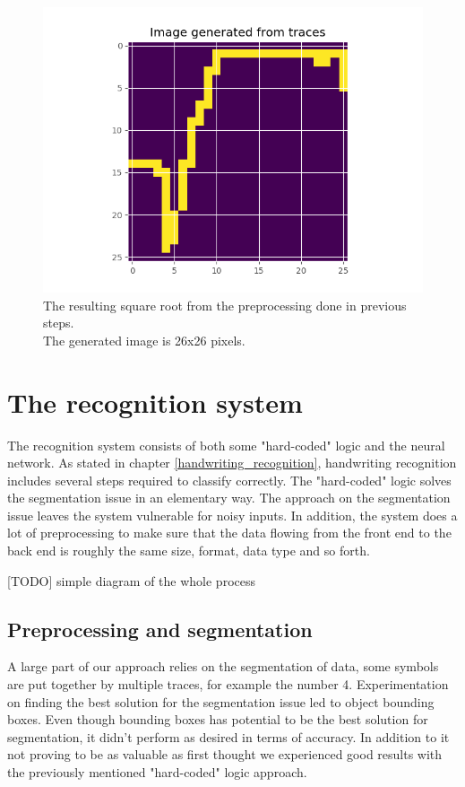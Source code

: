 \begin{figure}[H]
    \centering
    \includegraphics[width=\linewidth,keepaspectratio]{Assets/Chapter3_Method/sqrt_image.png}
    \caption{The resulting square root from the preprocessing done in previous steps.\\The generated image is 26x26 pixels.}
    \label{fig:sqrt_img}
\end{figure}

\section{The recognition system}
\label{the_recognintion_system}
The recognition system consists of both some "hard-coded" logic and the neural network. As stated in chapter \ref{handwriting_recognition}, handwriting recognition includes several steps required to classify correctly. The "hard-coded" logic solves the segmentation issue in an elementary way. The approach on the segmentation issue leaves the system vulnerable for noisy inputs. In addition, the system does a lot of preprocessing to make sure that the data flowing from the front end to the back end is roughly the same size, format, data type and so forth. 

[TODO] simple diagram of the whole process %

\subsection{Preprocessing and segmentation}
A large part of our approach relies on the segmentation of data, some symbols are put together by multiple traces, for example the number 4. Experimentation on finding the best solution for the segmentation issue led to object bounding boxes. Even though bounding boxes has potential to be the best solution for segmentation, it didn't perform as desired in terms of accuracy. In addition to it not proving to be as valuable as first thought we experienced good results with the previously mentioned "hard-coded" logic approach.

